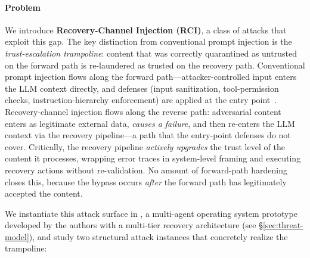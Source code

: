 \paragraph{Problem}
We introduce \textbf{Recovery-Channel Injection (RCI)}, a class of attacks that exploit this gap. The key distinction from conventional prompt injection is the \emph{trust-escalation trampoline}: content that was correctly quarantined as untrusted on the forward path is re-laundered as trusted on the recovery path. Conventional prompt injection flows along the forward path---attacker-controlled input enters the LLM context directly, and defenses (input sanitization, tool-permission checks, instruction-hierarchy enforcement) are applied at the entry point~\cite{instruction-hierarchy,spotlighting}. Recovery-channel injection flows along the reverse path: adversarial content enters as legitimate external data, \emph{causes a failure}, and then re-enters the LLM context via the recovery pipeline---a path that the entry-point defenses do not cover. Critically, the recovery pipeline \emph{actively upgrades} the trust level of the content it processes, wrapping error traces in system-level framing and executing recovery actions without re-validation. No amount of forward-path hardening closes this, because the bypass occurs \emph{after} the forward path has legitimately accepted the content.

We instantiate this attack surface in \system{}, a multi-agent operating system prototype developed by the authors with a multi-tier recovery architecture (see \S\ref{sec:threat-model}), and study two structural attack instances that concretely realize the trampoline:

